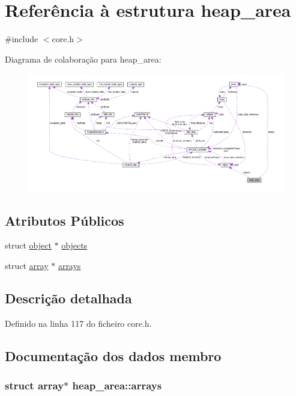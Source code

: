 \hypertarget{structheap__area}{\section{Referência à estrutura heap\-\_\-area}
\label{structheap__area}
}


{\ttfamily \#include $<$core.\-h$>$}



Diagrama de colaboração para heap\-\_\-area\-:\nopagebreak
\begin{figure}[H]
\begin{center}
\leavevmode
\includegraphics[width=350pt]{structheap__area__coll__graph}
\end{center}
\end{figure}
\subsection*{Atributos Públicos}
\begin{DoxyCompactItemize}
\item 
struct \hyperlink{structobject}{object} $\ast$ \hyperlink{structheap__area_a65ca4dc228035e942540602c47146d29}{objects}
\item 
struct \hyperlink{structarray}{array} $\ast$ \hyperlink{structheap__area_ad0a53fda1a9ad727ee47d6d9a6d155ca}{arrays}
\end{DoxyCompactItemize}


\subsection{Descrição detalhada}


Definido na linha 117 do ficheiro core.\-h.



\subsection{Documentação dos dados membro}
\hypertarget{structheap__area_ad0a53fda1a9ad727ee47d6d9a6d155ca}{
\subsubsection[{arrays}]{\setlength{\rightskip}{0pt plus 5cm}struct {\bf array}$\ast$ heap\-\_\-area\-::arrays}}\label{structheap__area_ad0a53fda1a9ad727ee47d6d9a6d155ca}


